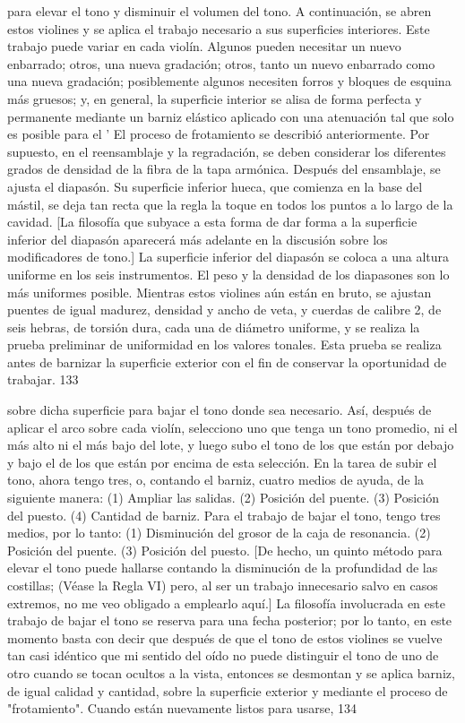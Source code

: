 para elevar el tono y disminuir el volumen del tono. A continuación, se abren estos violines y se aplica el trabajo necesario a sus superficies interiores. Este trabajo puede variar en cada violín. Algunos pueden necesitar un nuevo enbarrado; otros, una nueva gradación; otros, tanto un nuevo enbarrado como una nueva gradación; posiblemente algunos necesiten forros y bloques de esquina más gruesos; y, en general, la superficie interior se alisa de forma perfecta y permanente mediante un barniz elástico aplicado con una atenuación tal que solo es posible para el
'
El proceso de frotamiento se describió anteriormente. Por supuesto, en el reensamblaje y la regradación, se deben considerar los diferentes grados de densidad de la fibra de la tapa armónica. Después del ensamblaje, se ajusta el diapasón. Su superficie inferior hueca, que comienza en la base del mástil, se deja tan recta que la regla la toque en todos los puntos a lo largo de la cavidad.
[La filosofía que subyace a esta forma de dar forma a la superficie inferior del diapasón aparecerá más adelante en la discusión sobre los modificadores de tono.]
La superficie inferior del diapasón se coloca a una altura uniforme en los seis instrumentos. El peso y la densidad de los diapasones son lo más uniformes posible. Mientras estos violines aún están en bruto, se ajustan puentes de igual madurez, densidad y ancho de veta, y cuerdas de calibre 2, de seis hebras, de torsión dura, cada una de diámetro uniforme, y se realiza la prueba preliminar de uniformidad en los valores tonales. Esta prueba se realiza antes de barnizar la superficie exterior con el fin de conservar la oportunidad de trabajar.
133

sobre dicha superficie para bajar el tono donde sea necesario. Así, después de aplicar el arco sobre cada violín, selecciono uno que tenga un tono promedio, ni el más alto ni el más bajo del lote, y luego subo el tono de los que están por debajo y bajo el de los que están por encima de esta selección. En la tarea de subir el tono, ahora tengo tres, o, contando el barniz, cuatro medios de ayuda, de la siguiente manera:
(1) Ampliar las salidas.
(2) Posición del puente.
(3) Posición del puesto.
(4) Cantidad de barniz.
Para el trabajo de bajar el tono, tengo tres medios, por lo tanto:
(1) Disminución del grosor de la caja de resonancia.
(2) Posición del puente.
(3) Posición del puesto.
[De hecho, un quinto método para elevar el tono puede hallarse contando la disminución de la profundidad de las costillas; (Véase la Regla VI) pero, al ser un trabajo innecesario salvo en casos extremos, no me veo obligado a emplearlo aquí.]
La filosofía involucrada en este trabajo de bajar el tono se reserva para una fecha posterior; por lo tanto, en este momento basta con decir que después de que el tono de estos violines se vuelve tan casi idéntico que mi sentido del oído no puede distinguir el tono de uno de otro cuando se tocan ocultos a la vista, entonces se desmontan y se aplica barniz, de igual calidad y cantidad, sobre la superficie exterior y mediante el proceso de "frotamiento". Cuando están nuevamente listos para usarse,
134

